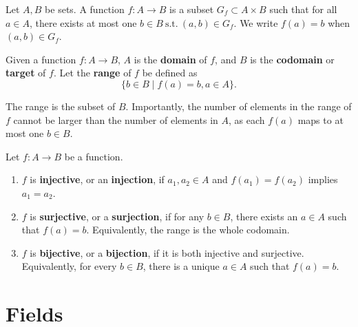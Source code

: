 \documentclass[math0540-lecture-notes.tex]{subfiles}
\begin{document}
\begin{definition}[Functions]{}
  Let $A, B$ be sets. A function $f: A \to B$ is a subset $G_f\subset A\times B$ such that for all
  $a\in A$, there exists at most one $b\in B~\text{s.t.}~\left( a,b \right) \in G_f$. We write $f(a)=b$ when  $\left(
  a, b \right) \in G_f$.
\end{definition}
\begin{definition}[Codomain]{} 
  Given a function $ f: A \to B$, $A$ is the \textbf{domain} of $f$, and $B$ is the
  \textbf{codomain} or \textbf{target} of $f$. Let the \textbf{range} of $f$ be defined as \[
    \{b\in B\mid f(a) = b, a\in A\}
  .\]
\end{definition}
The range is the subset of $B$. Importantly, the number of elements in the range of $f$ cannot be
larger than the number of elements in $A$, as each $f(a)$ maps to at most one $b\in B$.


\begin{definition}[Bijectivity]{}
  Let $ f: A \to B$ be a function.
  \begin{enumerate}
    \item $f$ is \textbf{injective}, or an \textbf{injection}, if $ a_1,a_2\in A$ and $f(a_1)
      = f(a_2) $ implies $ a_1=a_2$.
    \item $f$ is \textbf{surjective}, or a \textbf{surjection}, if for any $b\in B$, there exists an 
      $a\in A$ such that $f(a)=b$. Equivalently, the range is the whole codomain.
    \item $f$ is \textbf{bijective}, or a \textbf{bijection}, if it is both injective and
      surjective. Equivalently, for every $b\in B$, there is a unique $a\in A $ such that $f(a)=b$.
  \end{enumerate}
\end{definition}

\section{Fields}
\end{document}

